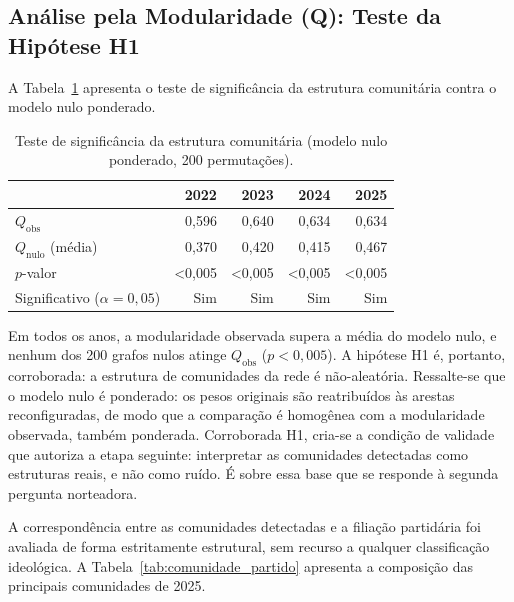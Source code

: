 \documentclass[
      12pt,
      a4paper,
      openright,
      oneside,
      chapter=TITLE,
      section=TITLE,
      english,
      french,
      spanish,
      brazilian
    ]{abntex2}
\begin{document}
    \subsection{Análise pela Modularidade (Q): Teste da Hipótese H1}
    
    A Tabela~\ref{tab:null_model} apresenta o teste de significância da estrutura comunitária contra o modelo nulo ponderado.
    
    \begin{table}[H]
    \centering
    \caption{Teste de significância da estrutura comunitária (modelo nulo ponderado, 200 permutações).}
    \label{tab:null_model}
    \begin{tabular}{lrrrr}
    \toprule
     & \textbf{2022} & \textbf{2023} & \textbf{2024} & \textbf{2025} \\
    \midrule
    $Q_{\text{obs}}$                       & 0,596  & 0,640  & 0,634  & 0,634  \\
    $Q_{\text{nulo}}$ (média)              & 0,370  & 0,420  & 0,415  & 0,467  \\
    $p$-valor                              & <0,005 & <0,005 & <0,005 & <0,005 \\
    Significativo ($\alpha=0{,}05$)        & Sim    & Sim    & Sim    & Sim    \\
    \bottomrule
    \end{tabular}
    \end{table}
    
    Em todos os anos, a modularidade observada supera a média do modelo nulo, e nenhum dos 200 grafos nulos atinge $Q_{\text{obs}}$ ($p<0{,}005$). A hipótese H1 é, portanto, corroborada: a estrutura de comunidades da rede é não-aleatória. Ressalte-se que o modelo nulo é ponderado: os pesos originais são reatribuídos às arestas reconfiguradas, de modo que a comparação é homogênea com a modularidade observada, também ponderada. Corroborada H1, cria-se a condição de validade que autoriza a etapa seguinte: interpretar as comunidades detectadas como estruturas reais, e não como ruído. É sobre essa base que se responde à segunda pergunta norteadora.
    
    A correspondência entre as comunidades detectadas e a filiação partidária foi avaliada de forma estritamente estrutural, sem recurso a qualquer classificação ideológica. A Tabela~\ref{tab:comunidade_partido} apresenta a composição das principais comunidades de 2025.
    
\end{document}
